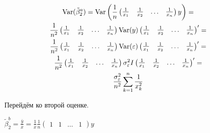 \begin{problem}
\begin{sol}
\begin{multline*}
\operatorname{Var}(\tilde{\beta}_2^a) = \operatorname{Var}\left(\frac{1}{n} \begin{pmatrix}
\frac{1}{x_1} & \frac{1}{x_2} & \ldots & \frac{1}{x_n}
\end{pmatrix} y\right) =\\
 \frac{1}{n^2} \begin{pmatrix}
\frac{1}{x_1} & \frac{1}{x_2} & \ldots & \frac{1}{x_n}
\end{pmatrix} \operatorname{Var}(y) \begin{pmatrix}
\frac{1}{x_1} & \frac{1}{x_2} & \ldots & \frac{1}{x_n}
\end{pmatrix}' =\\
\frac{1}{n^2} \begin{pmatrix}
\frac{1}{x_1} & \frac{1}{x_2} & \ldots & \frac{1}{x_n}
\end{pmatrix} \operatorname{Var}(\varepsilon) \begin{pmatrix}
\frac{1}{x_1} & \frac{1}{x_2} & \ldots & \frac{1}{x_n}
\end{pmatrix}' = \\
 \frac{1}{n^2} \begin{pmatrix}
\frac{1}{x_1} & \frac{1}{x_2} & \ldots & \frac{1}{x_n}
\end{pmatrix} \sigma_{\varepsilon}^2 I \begin{pmatrix}
\frac{1}{x_1} & \frac{1}{x_2} & \ldots & \frac{1}{x_n}
\end{pmatrix}' =\\
\frac{\sigma^2_{\varepsilon}}{n^2}\sum_{k=1}^n \frac{1}{x_k^2}
\end{multline*}

Перейдём ко второй оценке.

$\tilde{\beta}_2^b = \frac{\bar{y}}{\bar{x}} = \frac{1}{\bar{x}} \frac{1}{n} \begin{pmatrix}
1 & 1 & \ldots & 1
\end{pmatrix} y$



\end{sol}
\end{problem}
